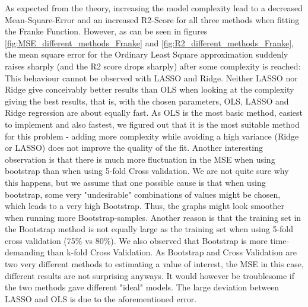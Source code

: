 \documentclass[11pt,a4paper,titlepage]{article}
\begin{document}
As expected from the theory, increasing the model complexity lead to a decreased Mean-Square-Error and an increased R2-Score for all three methods when fitting the Franke Function. However, as can be seen in figures \ref{fig:MSE_different_methods_Franke} and \ref{fig:R2_different_methods_Franke}, the mean square error for the Ordinary Least Square approximation suddenly raises sharply (and the R2 score drops sharply) after some complexity is reached: This behaviour cannot be observed with LASSO and Ridge. Neither LASSO nor Ridge give conceivably better results than OLS when looking at the complexity giving the best results, that is, with the chosen parameters, OLS, LASSO and Ridge regression are about equally fast. As OLS is the most basic method, easiest to implement and also fastest, we figured out that it is the most suitable method for this problem - adding more complexity while avoiding a high variance (Ridge or LASSO) does not improve the quality of the fit.  Another interesting observation is that there is much more fluctuation in the MSE when using bootstrap than when using 5-fold Cross validation. We are not quite sure why this happens, but we assume that one possible cause is that when using bootstrap, some very "undesirable" combinations of values might be chosen, which leads to a very high Bootstrap. Thus, the graphs might look smoother when running more Bootstrap-samples. Another reason is that the training set in the Bootstrap method is not equally large as the training set when using 5-fold cross validation (75\% vs 80\%). We also observed that Bootstrap is more time-demanding than k-fold Cross Validation. As Bootstrap and Cross Validation are two very different methods to estimating a value of interest, the MSE in this case, different results are not surprising anyways. It would however be troublesome if the two methods gave different "ideal" models. The large deviation between LASSO and OLS is due to the aforementioned error.
\end{document}
